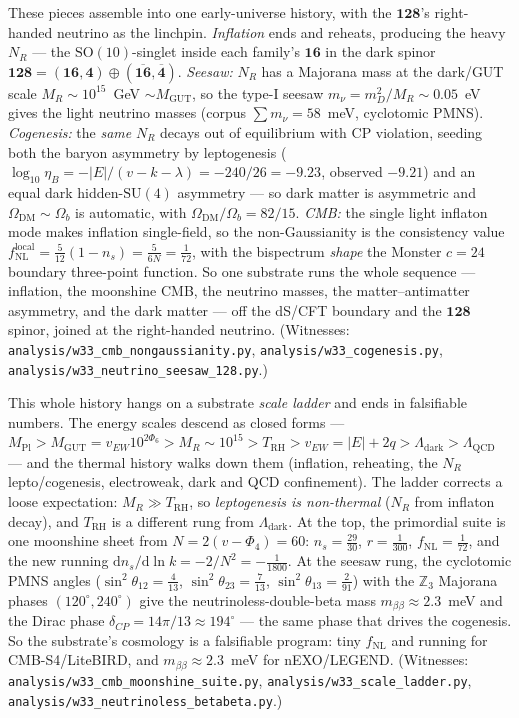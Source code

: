 \documentclass[11pt]{article}
\begin{document}
These pieces assemble into one early-universe history, with the $\mathbf{128}$'s
right-handed neutrino as the linchpin. \emph{Inflation} ends and reheats, producing
the heavy $N_R$ --- the $\mathrm{SO}(10)$-singlet inside each family's $\mathbf{16}$
in the dark spinor $\mathbf{128}=(\mathbf{16},\mathbf4)\oplus(\overline{\mathbf{16}},\overline{\mathbf4})$.
\emph{Seesaw:} $N_R$ has a Majorana mass at the dark/GUT scale $M_R\sim10^{15}$~GeV
$\sim M_{\mathrm{GUT}}$, so the type-I seesaw $m_\nu=m_D^2/M_R\sim0.05$~eV gives the
light neutrino masses (corpus $\sum m_\nu=58$~meV, cyclotomic PMNS). \emph{Cogenesis:}
the \emph{same} $N_R$ decays out of equilibrium with CP violation, seeding both the
baryon asymmetry by leptogenesis ($\log_{10}\eta_B=-|E|/(v-k-\lambda)=-240/26=-9.23$,
observed $-9.21$) and an equal dark hidden-$\mathrm{SU}(4)$ asymmetry --- so dark
matter is asymmetric and $\Omega_{\mathrm{DM}}\!\sim\!\Omega_b$ is automatic, with
$\Omega_{\mathrm{DM}}/\Omega_b=82/15$. \emph{CMB:} the single light inflaton mode
makes inflation single-field, so the non-Gaussianity is the consistency value
$f_{\mathrm{NL}}^{\mathrm{local}}=\tfrac5{12}(1-n_s)=\tfrac{5}{6N}=\tfrac1{72}$, with
the bispectrum \emph{shape} the Monster $c=24$ boundary three-point function. So
one substrate runs the whole sequence --- inflation, the moonshine CMB, the
neutrino masses, the matter--antimatter asymmetry, and the dark matter --- off the
dS/CFT boundary and the $\mathbf{128}$ spinor, joined at the right-handed neutrino.
(Witnesses: \texttt{analysis/w33\_cmb\_nongaussianity.py},
\texttt{analysis/w33\_cogenesis.py},
\texttt{analysis/w33\_neutrino\_seesaw\_128.py}.)

This whole history hangs on a substrate \emph{scale ladder} and ends in falsifiable
numbers. The energy scales descend as closed forms ---
$M_{\mathrm{Pl}}>M_{\mathrm{GUT}}=v_{EW}10^{2\Phi_6}>M_R\sim10^{15}>T_{\mathrm{RH}}>v_{EW}=|E|+2q>\Lambda_{\text{dark}}>\Lambda_{\mathrm{QCD}}$
--- and the thermal history walks down them (inflation, reheating, the $N_R$
lepto/cogenesis, electroweak, dark and QCD confinement). The ladder corrects a
loose expectation: $M_R\gg T_{\mathrm{RH}}$, so \emph{leptogenesis is non-thermal}
($N_R$ from inflaton decay), and $T_{\mathrm{RH}}$ is a different rung from
$\Lambda_{\text{dark}}$. At the top, the primordial suite is one moonshine sheet
from $N=2(v-\Phi_4)=60$: $n_s=\tfrac{29}{30}$, $r=\tfrac1{300}$,
$f_{\mathrm{NL}}=\tfrac1{72}$, and the new running
$\mathrm{d}n_s/\mathrm{d}\ln k=-2/N^2=-\tfrac1{1800}$. At the seesaw rung, the
cyclotomic PMNS angles ($\sin^2\theta_{12}=\tfrac4{13}$,
$\sin^2\theta_{23}=\tfrac7{13}$, $\sin^2\theta_{13}=\tfrac2{91}$) with the $\mathbb{Z}_3$
Majorana phases $(120^\circ,240^\circ)$ give the neutrinoless-double-beta mass
$m_{\beta\beta}\approx2.3$~meV and the Dirac phase $\delta_{CP}=14\pi/13\approx194^\circ$
--- the same phase that drives the cogenesis. So the substrate's cosmology is a
falsifiable program: tiny $f_{\mathrm{NL}}$ and running for CMB-S4/LiteBIRD, and
$m_{\beta\beta}\approx2.3$~meV for nEXO/LEGEND. (Witnesses:
\texttt{analysis/w33\_cmb\_moonshine\_suite.py},
\texttt{analysis/w33\_scale\_ladder.py},
\texttt{analysis/w33\_neutrinoless\_betabeta.py}.)
\end{document}
